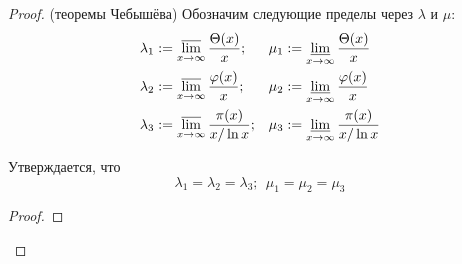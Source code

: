 \begin{proof} (теоремы Чебышёва)
	Обозначим следующие пределы через $\lambda$ и $\mu$:
	\begin{align*}
		&{\lambda_1 := \varlimsup\limits_{x \to \infty} \frac{\Theta(x)}{x};} & &{\mu_1 := \varliminf\limits_{x \to \infty} \frac{\Theta(x)}{x}} \\
		&{\lambda_2 := \varlimsup\limits_{x \to \infty} \frac{\phi(x)}{x};} & &{\mu_2 := \varliminf\limits_{x \to \infty} \frac{\phi(x)}{x}} \\
		&{\lambda_3 := \varlimsup\limits_{x \to \infty} \frac{\pi(x)}{x / \ln x};} & &{\mu_3 := \varliminf\limits_{x \to \infty} \frac{\pi(x)}{x / \ln x}}
	\end{align*}
	
	\begin{lemma}
		Утверждается, что
		\[
			\lambda_1 = \lambda_2 = \lambda_3;\ \ \mu_1 = \mu_2 = \mu_3
		\]
	\end{lemma}

	\begin{proof}
		
	\end{proof}
\end{proof}